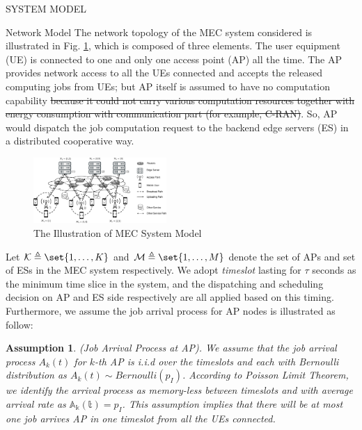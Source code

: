 \documentclass[10pt, conference, letterpaper]{IEEEtran}
\newtheorem{assumption}{Assumption}
\DeclarePairedDelimiter\set\{\}
\begin{document}
    \begin{section}{SYSTEM MODEL}
        \label{sec:model}
        \begin{subsection}{Network Model}
            The network topology of the MEC system considered is illustrated in Fig. \ref{fig:system}, which is composed of three elements. The user equipment (UE) is connected to one and only one access point (AP) all the time. The AP provides network access to all the UEs connected and accepts the released computing jobs from UEs; but AP itself is assumed to have no computation capability \st{because it could not carry various computation resources together with energy consumption with communication part (for example, C-RAN)}. So, AP would dispatch the job computation request to the backend edge servers (ES) in a distributed cooperative way.
            \begin{figure}[ht]
                \centering
                \includegraphics[width=0.45\textwidth, trim={0.5cm 0.5cm 0.5cm 0.5cm}, clip]{system-model.pdf}
                \caption{The Illustration of MEC System Model}
                \label{fig:system}
            \end{figure}

            Let $\mathcal{K} \triangleq \set{1,\dots,K}$ and $\mathcal{M} \triangleq \set{1,\dots,M}$ denote the set of APs and set of ESs in the MEC system respectively. We adopt \emph{timeslot} lasting for $\tau$ seconds as the minimum time slice in the system, and the dispatching and scheduling decision on AP and ES side respectively are all applied based on this timing. Furthermore, we assume the job arrival process for AP nodes is illustrated as follow:
            \begin{assumption}
                (Job Arrival Process at AP).
                We assume that the job arrival process $A_k(t)$ for $k$-th AP is i.i.d over the timeslots and each with Bernoulli distribution as $A_k(t) \sim Bernoulli(p_I)$.  According to \emph{Poisson Limit Theorem}, we identify the arrival process as memory-less between timeslots and with average arrival rate as $\mathbb{A_k(t)} = p_I$.
                This assumption implies that there will be at most one job arrives AP in one timeslot from all the UEs connected.
            \end{assumption}


\end{subsection}
\end{section}
\end{document}
